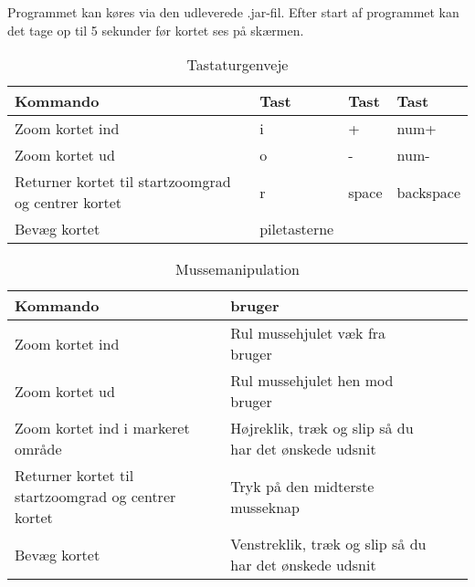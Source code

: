 Programmet kan køres via den udleverede .jar-fil. Efter start af programmet kan det tage op til 5 sekunder før kortet ses på skærmen.
\begin{table}[h!t]
\centering
	\caption{Tastaturgenveje}
	\begin{tabular}{p{3cm} l l l}
		\hline\hline
		Kommando & Tast & Tast & Tast \\ [0.5ex]
		\hline
		Zoom kortet ind & i & + & num+\\
		Zoom kortet ud & o & - & num-\\
		Returner kortet til startzoomgrad og centrer kortet & r & space & backspace\\
		Bevæg kortet & piletasterne\\
		\hline
	\end{tabular}
\end{table}

\begin{table}[h!t]
\centering
	\caption{Mussemanipulation}
	\begin{tabular}{p{3cm} l l p{5cm}}
		\hline\hline
		Kommando & bruger \\ [0.5ex]
		\hline
		Zoom kortet ind & Rul mussehjulet væk fra bruger\\
		Zoom kortet ud & Rul mussehjulet hen mod bruger\\
		Zoom kortet ind i markeret område & Højreklik, træk og slip så du har det ønskede udsnit\\
		Returner kortet til startzoomgrad og centrer kortet & Tryk på den midterste musseknap\\
		Bevæg kortet & Venstreklik, træk og slip så du har det ønskede udsnit\\
		\hline
	\end{tabular}
\end{table}